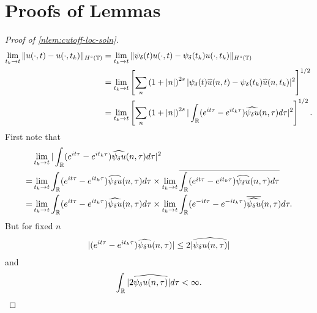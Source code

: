 \section{Proofs of Lemmas}
\begin{proof}[Proof of \cref{nlem:cutoff-loc-soln}]
%
%
\begin{equation}
  \label{ndm}
	\begin{split}
		\lim_{t_{k} \to t} \|u(\cdot, t) - u(\cdot, t_{k})\|_{H^s(\mathbb{T})} 
    & = \lim_{t_{k} \to t} \|\psi_{\delta}(t) u(\cdot, t) - \psi_{\delta}(t_{k}) u(\cdot, t_{k})\|_{H^s(\mathbb{T})} 
		\\
		& = \lim_{t_{k} \to t} \left[ \sum_{n}\left( 1 + | n |
    \right)^{2s} | \psi_{\delta}(t)  \widehat{u}(n, t) - \psi_{\delta}(t_{k}) \widehat{ u}(n, t_{k}) |^2 \right]^{1/2}
		\\
		& = \lim_{t_{k} \to t} \left[ \sum_{n} \left( 1 + | n |
    \right)^{2s} | \int_{\mathbb{R}} (e^{it \tau} - e^{it_{k} \tau})
    \widehat{\psi_{\delta} u}(n,
		\tau) d \tau |^2 \right]^{1/2}.
	\end{split}
\end{equation}
First note that
%
%
%
%
\begin{equation*}
\begin{split}
& \lim_{t_{k} \to t}  | \int_{\mathbb{R}} (e^{it \tau} - e^{it_{k} \tau})
    \widehat{\psi_{\delta} u}(n,
		\tau) d \tau |^2 
    \\
    = 
     & \lim_{t_{k} \to t}  \int_{\mathbb{R}} (e^{it \tau} - e^{it_{k} \tau})
    \widehat{\psi_{\delta} u}(n,
    \tau) d \tau \times \lim_{t_{k} \to t} \overline{\int_{\mathbb{R}} (e^{it \tau} - e^{it_{k} \tau})
    \widehat{\psi_{\delta} u}(n,
    \tau) d \tau }  
    \\
    = 
    &  \lim_{t_{k} \to t}  \int_{\mathbb{R}} (e^{it \tau} - e^{it_{k} \tau})
    \widehat{\psi_{\delta} u}(n,
    \tau) d \tau \times \lim_{t_{k} \to t} \int_{\mathbb{R}} (e^{-it \tau} - e^{-it_{k} \tau})
    \overline{\widehat{\psi_{\delta} u}}(n,
    \tau) d \tau.   
    \end{split}
\end{equation*}
%
%
But for fixed $n$ 
%
%
\begin{equation*}
\begin{split}
|(e^{it \tau} - e^{it_{k} \tau})  
    \widehat{\psi_{\delta} u}(n, \tau) | \le 2 |\widehat{\psi_{\delta} u(n, \tau)} |
\end{split}
\end{equation*}
%
%
and
%
%
%
\begin{equation*}
\begin{split}
  \int_{\rr} |2 \wh{\psi_{\delta} u(n, \tau)} | d \tau < \infty.

\end{split}
\end{equation*}
\end{proof}
